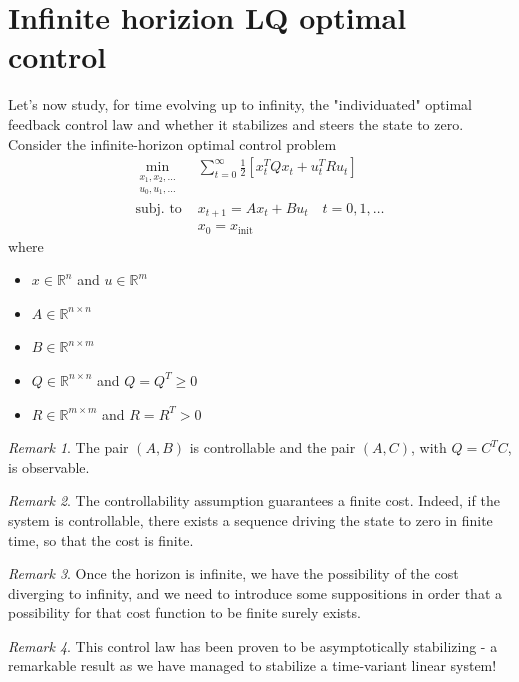 \documentclass[openany]{book}
\newcommand{\R}{\mathbb{R}}               %
\theoremstyle{definition}
\theoremstyle{remark}
\newtheorem*{remark}{Remark}
\begin{document}
\section{Infinite horizion LQ optimal control}
Let's now study, for time evolving up to infinity, the "individuated" optimal feedback control law and whether it stabilizes and steers the state to zero.\\
Consider the infinite-horizon optimal control problem
\begin{align*}
        \min_{\substack{x_1,x_2,\dots \\ u_0,u_1,\dots}} & \displaystyle\sum_{t=0}^{\infty}\displaystyle\frac{1}{2}\left[x_t^TQx_t+u_t^TRu_t\right] \\
        \text{subj. to } & x_{t+1} = Ax_t + Bu_t \quad t=0,1,\dots\\
                        &x_0 = x_{\text{init}}
\end{align*}
where 
\begin{itemize}
    \item $x\in\R^n$ and $u\in\R^m$
    \item $A\in\R^{n\times n}$
    \item $B\in\R^{n\times m}$
    \item $Q\in\R^{n\times n}$ and $Q=Q^T\geq 0$
    \item $R\in\R^{m\times m}$ and $R=R^T> 0$
\end{itemize}

\begin{remark}
The pair $(A,B)$ is controllable and the pair $(A,C)$, with $Q=C^TC$, is observable.
\end{remark}

\begin{remark}
The controllability assumption guarantees a finite cost. Indeed, if the system is controllable, there exists a sequence driving the state to zero in finite time, so that the cost is finite.
\end{remark}

\begin{remark}
Once the horizon is infinite, we have the possibility of the cost diverging to infinity, and we need to introduce some suppositions in order that a possibility for that cost function to be finite surely exists.
\end{remark}

\begin{remark}
This control law has been proven to be asymptotically stabilizing - a remarkable result as we have managed to stabilize a time-variant linear system!
\end{remark}
\end{document}
